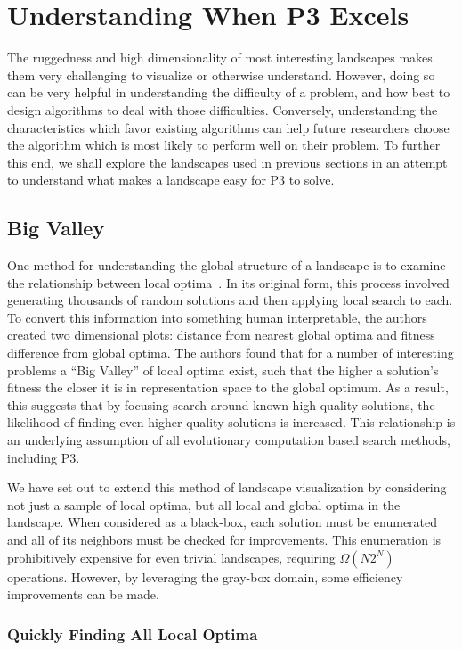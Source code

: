 \chapter{Understanding When P3 Excels}
The ruggedness and high dimensionality of most interesting landscapes makes them very challenging
to visualize or otherwise understand. However, doing so can be very helpful in
understanding the difficulty of a problem, and how best to design algorithms to deal
with those difficulties. Conversely, understanding the characteristics which favor
existing algorithms can help future researchers choose the algorithm which is
most likely to perform well on their problem. To further this end, we shall
explore the landscapes used in previous sections in an attempt to understand
what makes a landscape easy for P3 to solve.


\section{Big Valley}
One method for understanding the global structure of a landscape
is to examine the relationship between local optima~\cite{boese:1994:bigvalley}.
In its original form, this process involved generating thousands of random solutions and then applying
local search to each. To convert this information into something human interpretable,
the authors created two dimensional plots: distance from nearest global optima and
fitness difference from global optima.
The authors found that for a number of interesting problems a ``Big Valley'' of
local optima exist, such that the higher a solution's fitness the closer it is
in representation space to the global optimum. As a result, this suggests that
by focusing search around known high quality solutions, the likelihood of finding even
higher quality solutions is increased. This relationship is an underlying assumption
of all evolutionary computation based search methods, including P3.

We have set out to extend this method of landscape visualization by considering not
just a sample of local optima, but all local and global optima in the landscape.
When considered as a black-box, each solution must be enumerated and all of its
neighbors must be checked for improvements. This enumeration is prohibitively expensive for
even trivial landscapes, requiring $\Omega(N2^N)$ operations.
However, by leveraging the gray-box domain, some efficiency improvements can be made.

\subsection{Quickly Finding All Local Optima}

